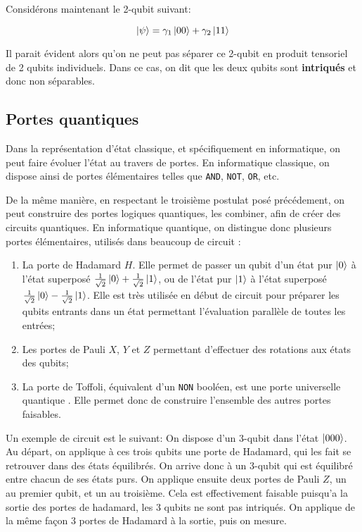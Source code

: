 \medbreak

Considérons maintenant le 2-qubit suivant:

\[
\ket{\psi} = \gamma_1 \ket{00} + \gamma_2 \ket{11}
\]

Il parait évident alors qu'on ne peut pas séparer ce 2-qubit en produit tensoriel de 2 qubits individuels. Dans ce cas, on dit que les deux qubits sont \textbf{intriqués} et donc non séparables.


\subsection{Portes quantiques}
Dans la représentation d'état classique, et spécifiquement en informatique, on peut faire évoluer l'état au travers de portes. En informatique classique, on dispose ainsi de portes élémentaires telles que \texttt{AND}, \texttt{NOT}, \texttt{OR}, etc. 

De la même manière, en respectant le troisième postulat posé précédement, on peut construire des portes logiques quantiques, les combiner, afin de créer des circuits quantiques. En informatique quantique, on distingue donc plusieurs portes élémentaires, utilisés dans beaucoup de circuit \cite{Barenco95}:

\begin{enumerate}
    \item La porte de Hadamard $H$. Elle permet de passer un qubit d'un état pur $\ket{0}$ à l'état superposé $\frac{1}{\sqrt{2}}\ket{0} + \frac{1}{\sqrt{2}}\ket{1}$, ou de l'état pur $\ket{1}$ à l'état superposé $\frac{1}{\sqrt{2}}\ket{0} - \frac{1}{\sqrt{2}}\ket{1}$. Elle est très utilisée en début de circuit pour préparer les qubits entrants dans un état permettant l'évaluation parallèle de toutes les entrées;
    \item Les portes de Pauli $X$, $Y$ et $Z$ permettant d'effectuer des rotations aux états des qubits;
    \item La porte de Toffoli, équivalent d'un \texttt{NON} booléen, est une porte universelle quantique \cite{shi2002toffoli}. Elle permet donc de construire l'ensemble des autres portes faisables.
\end{enumerate}

Un exemple de circuit est le suivant: On dispose d'un 3-qubit dans l'état $\ket{000}$. Au départ, on applique à ces trois qubits une porte de Hadamard, qui les fait se retrouver dans des états équilibrés. On arrive donc à un 3-qubit qui est équilibré entre chacun de ses états purs. On applique ensuite deux portes de Pauli $Z$, un au premier qubit, et un au troisième. Cela est effectivement faisable puisqu'a la sortie des portes de hadamard, les 3 qubits ne sont pas intriqués. On applique de la même façon 3 portes de Hadamard à la sortie, puis on mesure. 

